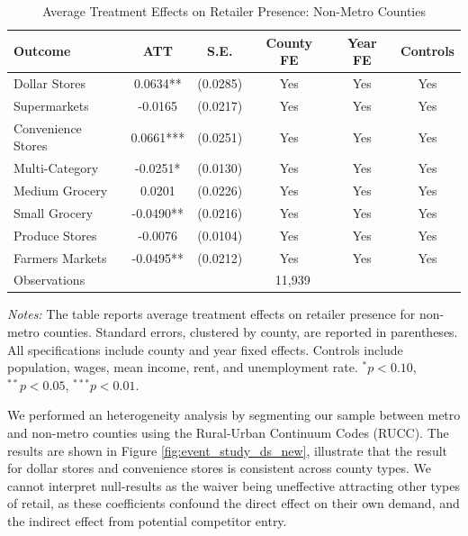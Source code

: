 \documentclass[12pt]{article}
\begin{document}
\begin{table}[!htbp]
\centering
\caption{Average Treatment Effects on Retailer Presence: Non-Metro Counties}
\label{tab:att_nonmetro}
\begin{threeparttable}
\begin{tabular}{lccccc}
\toprule
Outcome & ATT & S.E. & County FE & Year FE & Controls \\
\midrule
Dollar Stores      &  0.0634**  & (0.0285) & Yes & Yes & Yes \\
Supermarkets       & -0.0165    & (0.0217) & Yes & Yes & Yes \\
Convenience Stores &  0.0661*** & (0.0251) & Yes & Yes & Yes \\
Multi-Category     & -0.0251*   & (0.0130) & Yes & Yes & Yes \\
Medium Grocery     &  0.0201    & (0.0226) & Yes & Yes & Yes \\
Small Grocery      & -0.0490**  & (0.0216) & Yes & Yes & Yes \\
Produce Stores     & -0.0076    & (0.0104) & Yes & Yes & Yes \\
Farmers Markets    & -0.0495**  & (0.0212) & Yes & Yes & Yes \\
\midrule
Observations       & \multicolumn{5}{c}{11,939} \\
\bottomrule
\end{tabular}
\begin{tablenotes}
\footnotesize
\item \textit{Notes:} The table reports average treatment effects on retailer presence for non-metro counties. Standard errors, clustered by county, are reported in parentheses. All specifications include county and year fixed effects. Controls include population, wages, mean income, rent, and unemployment rate.
$^{*} p<0.10$, $^{**} p<0.05$, $^{***} p<0.01$.
\end{tablenotes}
\end{threeparttable}
\end{table}

We performed an heterogeneity analysis by segmenting our sample between metro and non-metro counties using the Rural-Urban Continuum Codes (RUCC). The results are shown in Figure \ref{fig:event_study_ds_new}, illustrate that the result for dollar stores and convenience stores is consistent across county types. We cannot interpret null-results as the waiver being uneffective attracting other types of retail, as these coefficients confound the direct effect on their own demand, and the indirect effect from potential competitor entry. 
\end{document}
